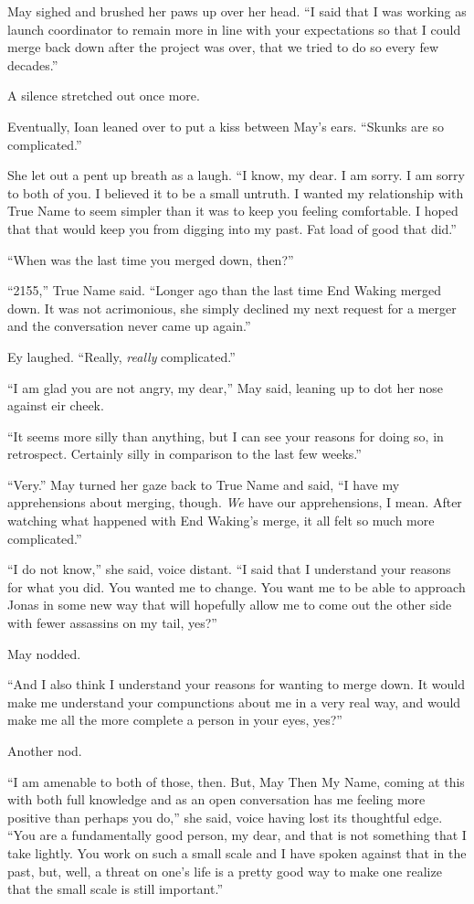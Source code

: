 May sighed and brushed her paws up over her head. ``I said that I was working as launch coordinator to remain more in line with your expectations so that I could merge back down after the project was over, that we tried to do so every few decades.''

A silence stretched out once more.

Eventually, Ioan leaned over to put a kiss between May's ears. ``Skunks are so complicated.''

She let out a pent up breath as a laugh. ``I know, my dear. I am sorry. I am sorry to both of you. I believed it to be a small untruth. I wanted my relationship with True Name to seem simpler than it was to keep you feeling comfortable. I hoped that that would keep you from digging into my past. Fat load of good that did.''

``When was the last time you merged down, then?''

``2155,'' True Name said. ``Longer ago than the last time End Waking merged down. It was not acrimonious, she simply declined my next request for a merger and the conversation never came up again.''

Ey laughed. ``Really, \emph{really} complicated.''

``I am glad you are not angry, my dear,'' May said, leaning up to dot her nose against eir cheek.

``It seems more silly than anything, but I can see your reasons for doing so, in retrospect. Certainly silly in comparison to the last few weeks.''

``Very.'' May turned her gaze back to True Name and said, ``I have my apprehensions about merging, though. \emph{We} have our apprehensions, I mean. After watching what happened with End Waking's merge, it all felt so much more complicated.''

``I do not know,'' she said, voice distant. ``I said that I understand your reasons for what you did. You wanted me to change. You want me to be able to approach Jonas in some new way that will hopefully allow me to come out the other side with fewer assassins on my tail, yes?''

May nodded.

``And I also think I understand your reasons for wanting to merge down. It would make me understand your compunctions about me in a very real way, and would make me all the more complete a person in your eyes, yes?''

Another nod.

``I am amenable to both of those, then. But, May Then My Name, coming at this with both full knowledge and as an open conversation has me feeling more positive than perhaps you do,'' she said, voice having lost its thoughtful edge. ``You are a fundamentally good person, my dear, and that is not something that I take lightly. You work on such a small scale and I have spoken against that in the past, but, well, a threat on one's life is a pretty good way to make one realize that the small scale is still important.''

